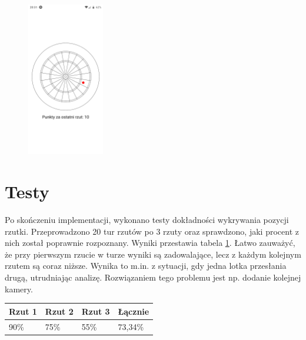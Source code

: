 \begin{figure}[h!]
\begin{center}
\includegraphics[width=0.3\textwidth]{obrazki/screenshot.png}
\end{center}
\label{screenshot}
\end{figure} 

\section{Testy}
Po skończeniu implementacji, wykonano testy dokładności wykrywania pozycji rzutki. Przeprowadzono 20 tur rzutów po 3 rzuty oraz sprawdzono, jaki procent z nich został poprawnie rozpoznany. Wyniki przestawia tabela \ref{table:testy}. Łatwo zauważyć, że przy pierwszym rzucie w turze wyniki są zadowalające, lecz z każdym kolejnym rzutem są coraz niższe. Wynika to m.in. z sytuacji, gdy jedna lotka przesłania drugą, utrudniając analizę. Rozwiązaniem tego problemu jest np. dodanie kolejnej kamery.
\begin{table}[h!]
\begin{tabular}{|l|l|l|l|}
\hline
Rzut 1 & Rzut 2 & Rzut 3 & Łącznie \\ \hline
90\%   & 75\%   & 55\%   & 73,34\% \\ \hline
\end{tabular}
\label{table:testy}
\end{table}

